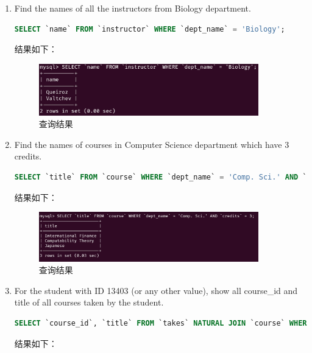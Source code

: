 \documentclass{article}
\begin{document}
\begin{enumerate}
  \item Find the names of all the instructors from Biology department.
  
\begin{lstlisting}[language=sql]
SELECT `name` FROM `instructor` WHERE `dept_name` = 'Biology';
\end{lstlisting}

结果如下：

\begin{figure}[H]
\centering
\includegraphics[width=0.9\textwidth]{img/7.png}
\caption{查询结果}
\end{figure}

\item Find the names of courses in Computer Science department which have 3 credits.
  
\begin{lstlisting}[language=sql]
SELECT `title` FROM `course` WHERE `dept_name` = 'Comp. Sci.' AND `credits` = 3;
\end{lstlisting}

结果如下：

\begin{figure}[H]
\centering
\includegraphics[width=0.9\textwidth]{img/8.png}
\caption{查询结果}
\end{figure}

\item For the student with ID 13403 (or any other value), show all course\_id and title of all courses taken by the student.

\begin{lstlisting}[language=sql]
SELECT `course_id`, `title` FROM `takes` NATURAL JOIN `course` WHERE `ID` = 13403;
\end{lstlisting}

结果如下：


\end{enumerate}
\end{document}
